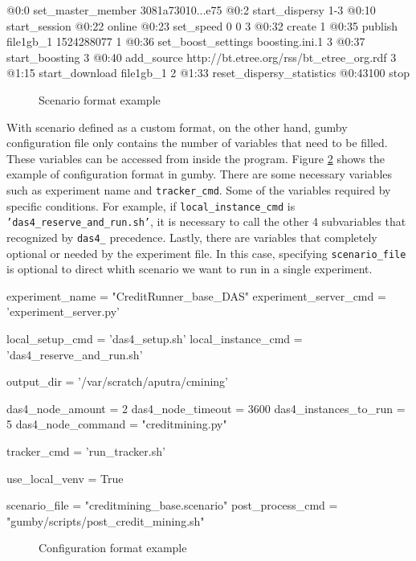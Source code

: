 \begin{verbbox}
@0:0 set_master_member 3081a73010...e75
@0:2 start_dispersy {1-3}
@0:10 start_session
@0:22 online
@0:23 set_speed 0 0 {3}
@0:32 create {1}
@0:35 publish file1gb_1 1524288077 {1}
@0:36 set_boost_settings boosting.ini.1 {3}
@0:37 start_boosting {3}
@0:40 add_source http://bt.etree.org/rss/bt_etree_org.rdf {3}
@1:15 start_download file1gb_1 {2}
@1:33 reset_dispersy_statistics
@0:43100 stop
\end{verbbox}

\begin{figure}[h]
	\fbox{\theverbbox}
	\caption{Scenario format example}
	\label{fig:gumbyscenario}
\end{figure}

With scenario defined as a custom format, on the other hand, gumby configuration file only contains the number of variables that need to be filled. These variables can be accessed from inside the program. Figure \ref{fig:gumbyconf} shows the example of configuration format in gumby. There are some necessary variables such as experiment name and \texttt{tracker\_cmd}. Some of the variables required by specific conditions. For example, if \texttt{local\_instance\_cmd} is \texttt{'das4\_reserve\_and\_run.sh'}, it is necessary to call the other 4 subvariables that recognized by \texttt{das4\_} precedence. Lastly, there are variables that completely optional or needed by the experiment file. In this case, specifying \texttt{scenario\_file} is optional to direct whith scenario we want to run in a single experiment.

\begin{verbbox}
experiment_name = "CreditRunner_base_DAS"
experiment_server_cmd = 'experiment_server.py'

local_setup_cmd = 'das4_setup.sh'
local_instance_cmd = 'das4_reserve_and_run.sh'

output_dir = '/var/scratch/aputra/cmining'

das4_node_amount = 2
das4_node_timeout = 3600
das4_instances_to_run = 5
das4_node_command = "creditmining.py"

tracker_cmd = 'run_tracker.sh'

use_local_venv = True

scenario_file = "creditmining_base.scenario"
post_process_cmd = "gumby/scripts/post_credit_mining.sh"
\end{verbbox}
\begin{figure}[]
	\fbox{\theverbbox}
	\caption{Configuration format example}
	\label{fig:gumbyconf}
\end{figure}

